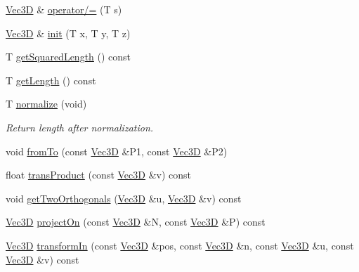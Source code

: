 \begin{DoxyCompactItemize}
\item 
\hyperlink{class_vec3_d}{Vec3D} \& \hyperlink{class_vec3_d_ae9b46ce6e66c8fc1a654009541d49249}{operator/=} (T s)
\item 
\hyperlink{class_vec3_d}{Vec3D} \& \hyperlink{class_vec3_d_a44a87f886b32a21b27c5936a8f129c37}{init} (T x, T y, T z)
\item 
T \hyperlink{class_vec3_d_a3f3e4665c8caf67d7f7f17ec2abd5f32}{getSquaredLength} () const 
\item 
T \hyperlink{class_vec3_d_ac11d1b04f2a13be7683cb96264ea2158}{getLength} () const 
\item 
T \hyperlink{class_vec3_d_a111bc7365a05c82d49d0ab77b32aad60}{normalize} (void)
\begin{DoxyCompactList}\small\item\em Return length after normalization. \end{DoxyCompactList}\item 
void \hyperlink{class_vec3_d_ac7606fe09a194a91afcb371e82d32f5f}{fromTo} (const \hyperlink{class_vec3_d}{Vec3D} \&P1, const \hyperlink{class_vec3_d}{Vec3D} \&P2)
\item 
float \hyperlink{class_vec3_d_a32af87172c2213797156bf4bd330d62d}{transProduct} (const \hyperlink{class_vec3_d}{Vec3D} \&v) const 
\item 
void \hyperlink{class_vec3_d_af6ab665ae785c15690f0ce9ac45648a5}{getTwoOrthogonals} (\hyperlink{class_vec3_d}{Vec3D} \&u, \hyperlink{class_vec3_d}{Vec3D} \&v) const 
\item 
\hyperlink{class_vec3_d}{Vec3D} \hyperlink{class_vec3_d_a55bf139b1b3ee68d1c9e163c48b7c0bc}{projectOn} (const \hyperlink{class_vec3_d}{Vec3D} \&N, const \hyperlink{class_vec3_d}{Vec3D} \&P) const 
\item 
\hyperlink{class_vec3_d}{Vec3D} \hyperlink{class_vec3_d_a7a507a9a4fa63d5d4dbea4a6b465881b}{transformIn} (const \hyperlink{class_vec3_d}{Vec3D} \&pos, const \hyperlink{class_vec3_d}{Vec3D} \&n, const \hyperlink{class_vec3_d}{Vec3D} \&u, const \hyperlink{class_vec3_d}{Vec3D} \&v) const 
\end{DoxyCompactItemize}
